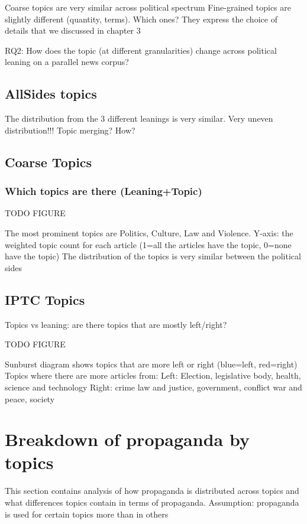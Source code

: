 Coarse topics are very similar across political spectrum
Fine-grained topics are slightly different (quantity, terms). Which ones? They express the choice of details that we discussed in chapter 3

RQ2: How does the topic (at different granularities) change across political leaning on a parallel news corpus?

\subsection{AllSides topics}

The distribution from the 3 different leanings is very similar. 
Very uneven distribution!!!
Topic merging? How?

\subsection{Coarse Topics}

\subsubsection{Which topics are there (Leaning+Topic)}

TODO FIGURE

The most prominent topics are Politics, Culture, Law and Violence.
Y-axis: the weighted topic count for each article (1=all the articles have the topic, 0=none have the topic)
The distribution of the topics is very similar between the political sides

\subsection{IPTC Topics}
Topics vs leaning: are there topics that are mostly left/right?

TODO FIGURE

Sunburst diagram shows topics that are more left or right (blue=left, red=right)
Topics where there are more articles from:
Left: Election, legislative body, health, science and technology
Right: crime law and justice, government, conflict war and peace, society


\section{Breakdown of propaganda by topics}

This section contains analysis of how propaganda is distributed across topics and what differences topics contain in terms of propaganda.
Assumption: propaganda is used for certain topics more than in others

